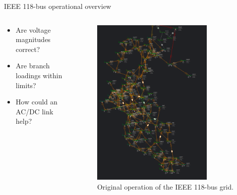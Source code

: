 \begin{frame}{IEEE 118-bus operational overview}
    \begin{columns}
        
        \begin{column}{0.4\textwidth}
            \begin{itemize}
                \item Are voltage magnitudes correct?
                \item Are branch loadings within limits?
                \item How could an AC/DC link help?
            \end{itemize}
        \end{column}

        \begin{column}{0.45\textwidth}
     \begin{figure}[H]
        \centering
    \includegraphics[width=0.80\textwidth]{Images/ie18_oper_v3.png}
    \caption{Original operation of the IEEE 118-bus grid.}
    \label{fig:118op}
    \end{figure}   
        \end{column}
    \end{columns}

\end{frame}

